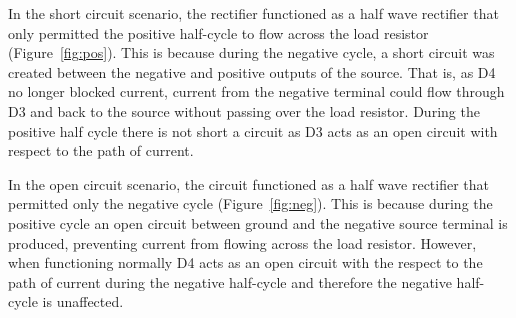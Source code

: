 \documentclass[12pt]{article}
\begin{document}
In the short circuit scenario, the rectifier functioned as a half wave rectifier that only permitted the positive half-cycle to flow across the load resistor (Figure~\ref{fig:pos}). This is because during the negative cycle, a short circuit was created between the negative and positive outputs of the source. That is, as D4 no longer blocked current, current from the negative terminal could flow through D3 and back to the source without passing over the load resistor. During the positive half cycle there is not short a circuit as D3 acts as an open circuit with respect to the path of current.

In the open circuit scenario, the circuit functioned as a half wave rectifier that permitted only the negative cycle (Figure~\ref{fig:neg}). This is because during the positive cycle an open circuit between ground and the negative source terminal is produced, preventing current from flowing across the load resistor. However, when functioning normally D4 acts as an open circuit with the respect to the path of current during the negative half-cycle and therefore the negative half-cycle is unaffected.
\end{document}
